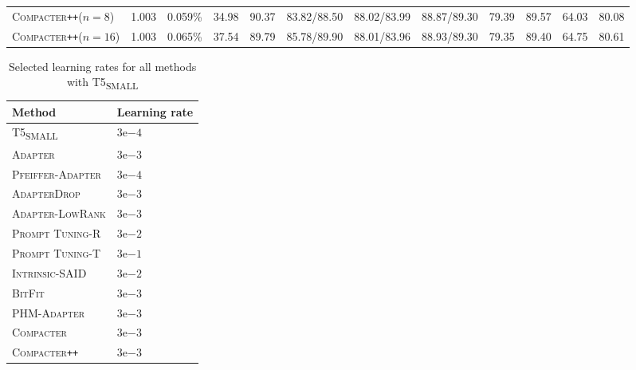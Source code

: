 \documentclass{article}
\newcommand{\basesmall}{T5\textsubscript{\tiny SMALL}\xspace}
\newcommand{\adapter}{\textsc{Adapter}\xspace}
\newcommand{\adapterlowrank}{\textsc{Adapter-LowRank}\xspace}
\newcommand{\compacter}{\textsc{Compacter}\xspace}
\newcommand{\compacteronlyff}{\textsc{Compacter}\texttt{++}\xspace} %
\newcommand{\phmadapter}{\textsc{PHM-Adapter}\xspace}
\newcommand{\intrinsic}{\textsc{Intrinsic-SAID}\xspace}
\newcommand{\prompttuningrandom}{\textsc{Prompt Tuning-R}\xspace}
\newcommand{\prompttuningtokens}{\textsc{Prompt Tuning-T}\xspace}
\newcommand{\pfeifferadapter}{\textsc{Pfeiffer-Adapter}\xspace}
\newcommand{\adapterdrop}{\textsc{AdapterDrop}\xspace}
\newcommand{\bitfit}{\textsc{BitFit}\xspace}
\begin{document}
\begin{table}[H]
\begin{adjustbox}{max width=\textwidth}
\begin{tabular}{l@{\hskip 0.02in}|l@{\hskip 0.06in}l@{\hskip 0.0in}|l@{\hskip 0.08in}l@{\hskip 0.08in}l@{\hskip 0.08in}l@{\hskip 0.08in}l@{\hskip 0.08in}l@{\hskip 0.08in}l@{\hskip 0.08in}l|l}
\compacteronlyff ($n=8$) & 1.003 &0.059\%&34.98 &  90.37 &   83.82/88.50 &  88.02/83.99 &   88.87/89.30 &  79.39 &  89.57 &  64.03 &  80.08 \\
\compacteronlyff ($n=16$) & 1.003&0.065\%& 37.54 &  89.79 &   85.78/89.90 &  88.01/83.96 &   88.93/89.30 &  79.35 &  89.40 &  64.75 &  80.61 \\

\bottomrule
\end{tabular}
\label{tab:glue_results_small_model}
\end{adjustbox}
\end{table}








\begin{table}[H]
    \begin{minipage}{.5\linewidth}
     \centering
       \caption{Selected learning rates for all methods with \basesmall}
       \begin{tabular}{ll}
    \toprule
    \textbf{Method} & \textbf{Learning rate}   \\
    \midrule  
    \basesmall &  $3\mathrm{e}{-4}$\\
    \adapter & $3\mathrm{e}{-3}$\\ 
    \pfeifferadapter & $3\mathrm{e}{-4}$\\ 
    \adapterdrop & $3\mathrm{e}{-3}$\\ 
    \adapterlowrank & $3\mathrm{e}{-3}$ \\ 
    \prompttuningrandom & $3\mathrm{e}{-2}$\\ 
    \prompttuningtokens & $3\mathrm{e}{-1}$\\
    \intrinsic &  $3\mathrm{e}{-2}$ \\
    \bitfit & $3\mathrm{e}{-3}$\\ 
    \phmadapter &   $3\mathrm{e}{-3}$\\ 
    \compacter &  $3\mathrm{e}{-3}$ \\  
    \compacteronlyff & $3\mathrm{e}{-3}$ \\ 
    \bottomrule
    \end{tabular}
     \label{tab:lrs_t5_small}
    

\end{minipage}
\end{table}
\end{document}
